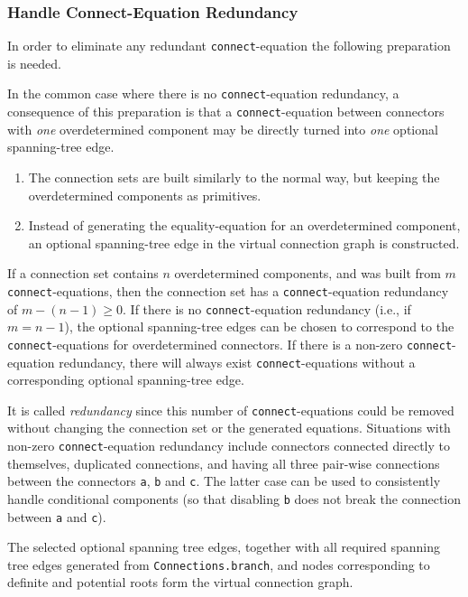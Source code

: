 \subsubsection{Handle Connect-Equation Redundancy}
In order to eliminate any redundant \lstinline!connect!-equation the following preparation is needed.
\begin{nonnormative}
In the common case where there is no \lstinline!connect!-equation redundancy, a consequence of this preparation is that a \lstinline!connect!-equation between connectors with \emph{one} overdetermined component may be directly turned into \emph{one} optional spanning-tree edge.
\end{nonnormative}
\begin{enumerate}
\item
  The connection sets are built similarly to the normal way, but keeping the overdetermined components as primitives.
\item
  Instead of generating the equality-equation for an overdetermined component, an optional spanning-tree edge in the virtual connection graph is constructed.
\end{enumerate}
\begin{nonnormative}
If a connection set contains $n$ overdetermined components, and was built from $m$ \lstinline!connect!-equations, then the connection set has a \lstinline!connect!-equation redundancy of $m - (n - 1) \geq 0$.
If there is no \lstinline!connect!-equation redundancy (i.e., if $m=n-1$), the optional spanning-tree edges can be chosen to correspond to the \lstinline!connect!-equations for overdetermined connectors.
If there is a non-zero \lstinline!connect!-equation redundancy, there will always exist \lstinline!connect!-equations without a corresponding optional spanning-tree edge.

It is called \emph{redundancy} since this number of \lstinline!connect!-equations could be removed without changing the connection set or the generated equations.
Situations with non-zero \lstinline!connect!-equation redundancy include connectors connected directly to themselves, duplicated connections, and having all three pair-wise connections between the connectors \lstinline!a!, \lstinline!b! and \lstinline!c!.
The latter case can be used to consistently handle conditional components (so that disabling \lstinline!b! does not break the connection between \lstinline!a! and \lstinline!c!).
\end{nonnormative}
The selected optional spanning tree edges, together with all required spanning tree edges generated from \lstinline!Connections.branch!, and nodes corresponding to definite and potential roots form the virtual connection graph.

